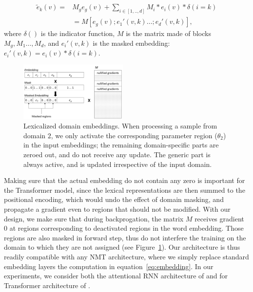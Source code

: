 \documentclass[a4paper]{article}
\begin{document}
\begin{align}
  \tilde{e}_k(v) =& M_g e_g(v) + \sum_{i \in [1,..,d]} M_i * e_i(v) * \delta(i=k) \nonumber \\
   & = M [e_g(v); e_1'(v,k) \dots; e_d'(v,k)], \label{eq:embedding}
\end{align}
where $\delta()$ is the indicator function, $M$ is the matrix made of blocks $M_g, M_1 \dots, M_d$, and $e_i'(v,k)$ is the masked embedding: $e_i'(v,k)= e_i(v) * \delta(i=k)$.  

\begin{figure}[h]
  \center
  \includegraphics[width=0.48\textwidth]{embeddings}
  \caption{Lexicalized domain embeddings. When processing a sample from domain $2$, we only activate the corresponding parameter region ($\theta_2$) in the input embeddings; the remaining domain-specific parts are zeroed out, and do not receive any update. The generic part is always active, and is updated irrespective of the input domain.} 
  \label{fig:network}
\end{figure}

Making sure that the actual embedding do not contain any zero is important for the Transformer model, since the lexical representations are then summed to the positional encoding, which would undo the effect of domain masking, and propagate a gradient even to regions that should not be modified. 
With our design, we make sure that during backprogation, the matrix $M$ receives gradient $0$ at regions corresponding to deactivated regions in the word embedding. 
Those regions are also masked in forward step, thus do not interfere the training on the domain to which they are not assigned (see Figure~\ref{fig:network}).
%
Our architecture is thus readily compatible with any NMT architecture, where we simply replace standard embedding layers the computation in equation~\eqref{eq:embedding}. In our experiments, we consider both the attentional RNN architecture of \cite{Bahdanau15learning} and for Transformer architecture of \cite{Vaswani17attention}.
\end{document}
